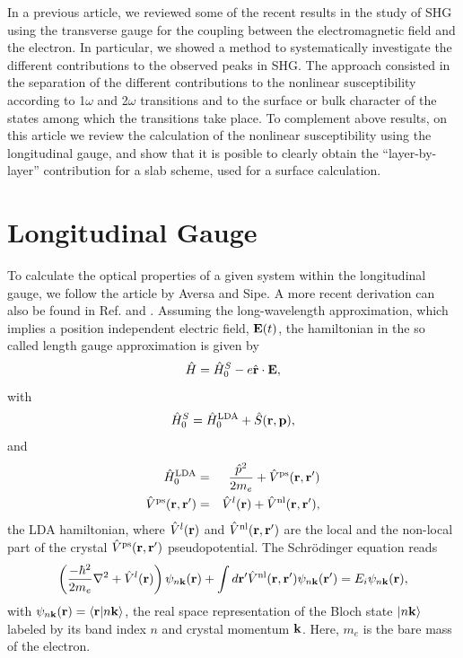 \documentclass[floatfix,prb,aps,superscriptaddress,11pt,preprint]{revtex4}
\begin{document}
In a previous article,\cite{mendoza01b} we reviewed some of the recent
results
in the study of SHG using the transverse gauge for the coupling between
the electromagnetic field and the electron.
In particular, we
showed a method
to systematically investigate the
different
contributions to the observed peaks in SHG.\cite{arzate00} The approach
consisted
in the separation of the different contributions to
the nonlinear susceptibility
according to 1$\omega$ and 2$\omega$ transitions and to
the  surface or bulk character of the states among which the transitions
take place.
To complement above results, on this article we review the calculation of
the nonlinear susceptibility using the longitudinal gauge, and show that
it is posible to clearly obtain the ``layer-by-layer'' contribution
for a slab scheme, used for a surface calculation.

\section{Longitudinal Gauge}\label{longi}

To calculate the optical properties of a given system
within the longitudinal gauge, we follow the article by
Aversa and Sipe.\cite{aversa95} A more recent derivation can also be
found in
Ref.  and .
 Assuming the long-wavelength approximation,
which implies a position independent electric field, 
$\mathbf{E}(t)$,  
the hamiltonian in the so called length gauge approximation
is given by
\begin{equation}\label{ache}
\hat{H}=\hat{H}^S_0-e \hat{\mathbf{r}} \cdot \mathbf{E},
\end{equation}
with
\begin{eqnarray}\label{ache.1}
\hat H^S_0=\hat H^{\mathrm{LDA}}_0
 + \hat S(\mathbf{r},\mathbf{p})
,
\end{eqnarray} 
and
\begin{eqnarray}\label{ache.2}
\hat H^{\mathrm{LDA}}_0&=&\frac{\hat p^2}{2m_e}  + \hat V^{\mathrm{ps}}(\mathbf{r},\mathbf{r}')
\nonumber\\
\hat V^{\mathrm{ps}}(\mathbf{r},\mathbf{r}')
&=&\hat V^l(\mathbf{r}) + \hat V^{\mathrm{nl}}(\mathbf{r},\mathbf{r}')
,
\end{eqnarray}  
the LDA hamiltonian, 
where $\hat V^l(\mathbf{r})$ and $\hat V^{\mathrm{nl}}(\mathbf{r},\mathbf{r}')$ are the local and
the non-local part of the  
crystal $\hat V^{\mathrm{ps}}(\mathbf{r},\mathbf{r}')$ pseudopotential.
The Schr\"odinger equation reads
\begin{eqnarray}\label{ache.4}
\left(
\frac{-\hbar^2}{2m_e}\nabla^2
 + \hat V^l(\mathbf{r})\right)\psi_{n\mathbf{k}}(\mathbf{r})
 + \int d\mathbf{r}'\hat V^{\mathrm{nl}}(\mathbf{r},\mathbf{r}')\psi_{n\mathbf{k}}(\mathbf{r}')
=E_i\psi_{n\mathbf{k}}(\mathbf{r})
,
\end{eqnarray} 
with $\psi_{n\mathbf{k}}(\mathbf{r})=\langle {\mathbf{r}} | {n\mathbf{k}} \rangle$, the real space
representation of the Bloch state $| n\mathbf{k} \rangle$
labeled
by  its
band index $n$ and crystal momentum $\mathbf{k}$. 
Here, $m_e$ is the 
bare mass of the 
electron.
\end{document}
